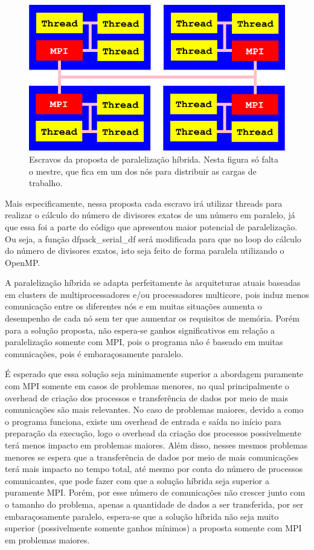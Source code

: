 \documentclass[12pt]{article}
\begin{document}
\begin{figure}[H]
	\centering
	\includegraphics[width=0.7\linewidth]{./hybridparallel}
	\caption{Escravos da proposta de paralelização híbrida. Nesta figura só falta o mestre, que fica em um dos nós para distribuir as cargas de trabalho.}
	\label{fig:hybridparallel}
\end{figure}

Mais especificamente, nessa proposta cada escravo irá utilizar threads para realizar o cálculo do número de divisores exatos de um número em paralelo, já que essa foi a parte do código que apresentou maior potencial de paralelização. Ou seja, a função dfpack\_serial\_df será modificada para que no loop do cálculo do número de divisores exatos, isto seja feito de forma paralela utilizando o OpenMP.

A paralelização híbrida se adapta perfeitamente às arquiteturas atuais baseadas em clusters de multiprocessadores e/ou processadores multicore, pois induz menos comunicação entre os diferentes nós e em muitas situações aumenta o desempenho de cada nó sem ter que aumentar os requisitos de memória. Porém para a solução proposta, não espera-se ganhos significativos em relação a paralelização somente com MPI, pois o programa não é baseado em muitas comunicações, pois é embaraçosamente paralelo.

É esperado que essa solução seja minimamente superior a abordagem puramente com MPI somente em casos de problemas menores, no qual principalmente o overhead de criação dos processos e transferência de dados por meio de mais comunicações são mais relevantes. No caso de problemas maiores, devido a como o programa funciona, existe um overhead de entrada e saída no início para preparação da execução, logo o overhead da criação dos processos possivelmente terá menos impacto em problemas maiores. Além disso, nesses mesmos problemas menores se espera que a transferência de dados por meio de mais comunicações terá mais impacto no tempo total, até mesmo por conta do número de processos comunicantes, que pode fazer com que a solução híbrida seja superior a puramente MPI. Porém, por esse número de comunicações não crescer junto com o tamanho do problema, apenas a quantidade de dados a ser transferida, por ser embaraçosamente paralelo, espera-se que a solução híbrida não seja muito superior (possivelmente somente ganhos mínimos) a proposta somente com MPI em problemas maiores.
\end{document}

